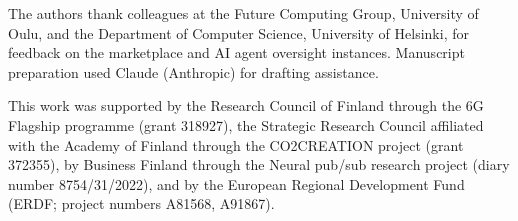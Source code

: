 \documentclass[acmsmall,nonacm,screen]{acmart}
\theoremstyle{acmplain}%
\theoremstyle{acmdefinition}%
\numberwithin{equation}{section}
\begin{document}
\begin{acks}
The authors thank colleagues at the Future Computing Group, University of
Oulu, and the Department of Computer Science, University of Helsinki, for
feedback on the marketplace and AI agent oversight instances. Manuscript preparation used Claude
(Anthropic) for drafting assistance.

This work was supported by the Research Council of Finland through the 6G
Flagship programme (grant 318927), the Strategic Research Council affiliated
with the Academy of Finland through the CO2CREATION project (grant 372355),
by Business Finland through the Neural pub/sub research project (diary number
8754/31/2022), and by the European Regional Development Fund (ERDF; project
numbers A81568, A91867).
\end{acks}




\end{document}
